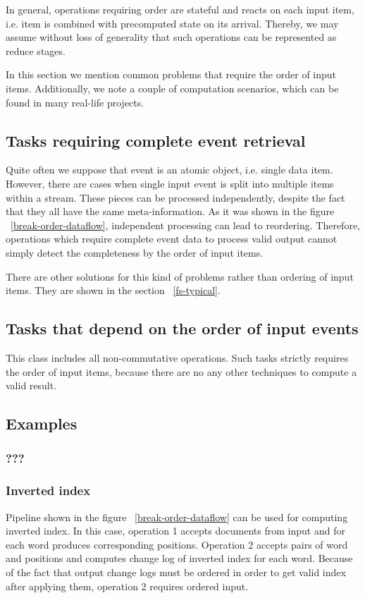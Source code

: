 
\label {fs-tasks}

In general, operations requiring order are stateful and reacts on each input item, i.e. item is combined with precomputed state on its arrival. Thereby, we may assume without loss of generality that such operations can be represented as reduce stages.

In this section we mention common problems that require the order of input items. Additionally, we note a couple of computation scenarios, which can be found in many real-life projects.

\subsection{Tasks requiring complete event retrieval}
Quite often we suppose that event is an atomic object, i.e. single data item. However, there are cases when single input event is split into multiple items within a stream. These pieces can be processed independently, despite the fact that they all have the same meta-information. As it was shown in the figure ~\ref{break-order-dataflow}, independent processing can lead to reordering. Therefore, operations which require complete event data to process valid output cannot simply detect the completeness by the order of input items.

There are other solutions for this kind of problems rather than ordering of input items. They are shown in the section ~\ref{fs-typical}. 

\subsection{Tasks that depend on the order of input events}
This class includes all non-commutative operations. Such tasks strictly requires the order of input items, because there are no any other techniques to compute a valid result.

\subsection{Examples}

\subsubsection{???}


\subsubsection{Inverted index}
Pipeline shown in the figure ~\ref{break-order-dataflow} can be used for computing inverted index. In this case, operation 1 accepts documents from input and for each word produces corresponding positions. Operation 2 accepts pairs of word and positions and computes change log of inverted index for each word. Because of the fact that output change logs must be ordered in order to get valid index after applying them, operation 2 requires ordered input. 
